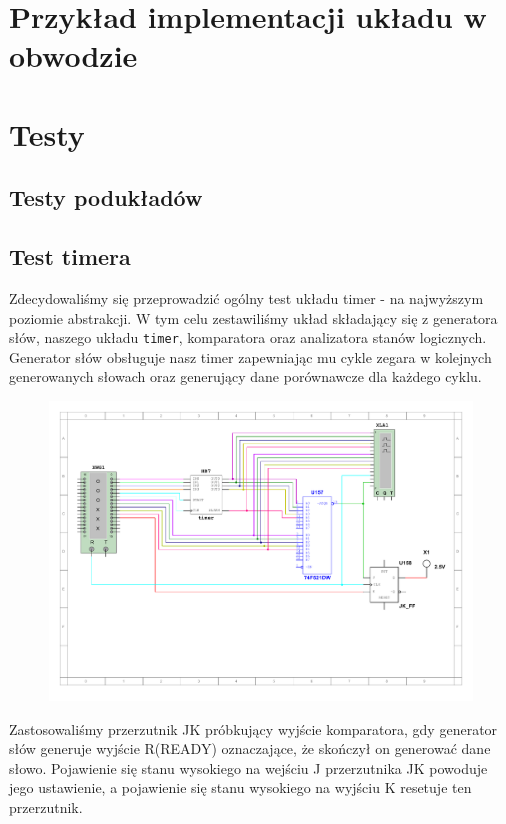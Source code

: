\documentclass[a4paper]{article}
\begin{document}
\section{Przykład implementacji układu w obwodzie}

\pagebreak
\section{Testy}
\subsection{Testy podukładów}
\subsection{Test timera}
Zdecydowaliśmy się przeprowadzić ogólny test układu timer - na najwyższym poziomie abstrakcji.
W tym celu zestawiliśmy układ składający się z generatora słów, naszego układu \verb|timer|, komparatora oraz analizatora
stanów logicznych. Generator słów obsługuje nasz timer zapewniając mu cykle zegara w kolejnych 
generowanych słowach oraz generujący dane porównawcze dla każdego cyklu.

\begin{figure}[H]
    \centering
    \includegraphics[width=\textwidth]{general_test.pdf}
\end{figure}

Zastosowaliśmy przerzutnik JK próbkujący wyjście komparatora, gdy generator słów generuje wyjście R(READY)
oznaczające, że skończył on generować dane słowo. Pojawienie się stanu wysokiego na wejściu J przerzutnika JK
powoduje jego ustawienie, a pojawienie się stanu wysokiego na wyjściu K resetuje ten przerzutnik.
\end{document}
